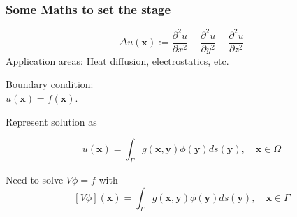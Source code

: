 \documentclass[dvipsnames,10pt]{beamer}
\def\bx{\mathbf{x}}
\def\by{\mathbf{y}}
\begin{document}
\begin{frame}
	\frametitle{Some Maths to set the stage}
	
    \begin{minipage}{5cm}
\end{minipage}
\begin{minipage}{5cm}
$$
\Delta u(\bx) := \frac{\partial^2 u}{\partial x^2} + \frac{\partial^2 u}{\partial y^2} + \frac{\partial^2 u}{\partial z^2}
$$
Application areas: Heat diffusion, electrostatics, etc.

\vspace{\baselineskip}
Boundary condition:\\ $u(\bx) = f(\bx)$.


\end{minipage}

\vspace{.5cm}

Represent solution as

	\begin{tcolorbox}
	$$
	u(\bx) = \int_{\Gamma} g(\bx, \by)\phi(\by)ds(\by),\quad \bx\in\Omega 
	$$
	\end{tcolorbox}

	Need to solve $V\phi = f$ with
	$$
	[V\phi](\bx) = \int_{\Gamma} g(\bx, \by)\phi(\by)ds(\by),\quad \bx\in\Gamma
	$$

	

	
\end{frame}
	
\end{document}
